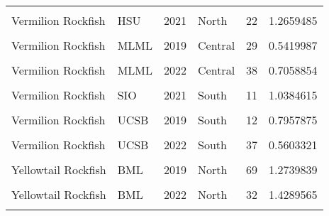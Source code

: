 \documentclass[
]{article}
\begin{document}
\begin{longtable}[t]{llrlrr}
\cellcolor{gray!6}{Vermilion Rockfish} & \cellcolor{gray!6}{HSU} & \cellcolor{gray!6}{2019} & \cellcolor{gray!6}{North} & \cellcolor{gray!6}{15} & \cellcolor{gray!6}{1.3187554}\\
Vermilion Rockfish & HSU & 2021 & North & 22 & 1.2659485\\
\cellcolor{gray!6}{Vermilion Rockfish} & \cellcolor{gray!6}{HSU} & \cellcolor{gray!6}{2022} & \cellcolor{gray!6}{North} & \cellcolor{gray!6}{13} & \cellcolor{gray!6}{1.0557610}\\
Vermilion Rockfish & MLML & 2019 & Central & 29 & 0.5419987\\
\addlinespace
\cellcolor{gray!6}{Vermilion Rockfish} & \cellcolor{gray!6}{MLML} & \cellcolor{gray!6}{2021} & \cellcolor{gray!6}{Central} & \cellcolor{gray!6}{18} & \cellcolor{gray!6}{0.6092897}\\
Vermilion Rockfish & MLML & 2022 & Central & 38 & 0.7058854\\
\cellcolor{gray!6}{Vermilion Rockfish} & \cellcolor{gray!6}{SIO} & \cellcolor{gray!6}{2019} & \cellcolor{gray!6}{South} & \cellcolor{gray!6}{11} & \cellcolor{gray!6}{0.4227564}\\
Vermilion Rockfish & SIO & 2021 & South & 11 & 1.0384615\\
\cellcolor{gray!6}{Vermilion Rockfish} & \cellcolor{gray!6}{SIO} & \cellcolor{gray!6}{2022} & \cellcolor{gray!6}{South} & \cellcolor{gray!6}{36} & \cellcolor{gray!6}{0.5225564}\\
\addlinespace
Vermilion Rockfish & UCSB & 2019 & South & 12 & 0.7957875\\
\cellcolor{gray!6}{Vermilion Rockfish} & \cellcolor{gray!6}{UCSB} & \cellcolor{gray!6}{2021} & \cellcolor{gray!6}{South} & \cellcolor{gray!6}{25} & \cellcolor{gray!6}{0.6141829}\\
Vermilion Rockfish & UCSB & 2022 & South & 37 & 0.5603321\\
\cellcolor{gray!6}{Widow Rockfish} & \cellcolor{gray!6}{BML} & \cellcolor{gray!6}{2019} & \cellcolor{gray!6}{North} & \cellcolor{gray!6}{3} & \cellcolor{gray!6}{0.3504274}\\
Yellowtail Rockfish & BML & 2019 & North & 69 & 1.2739839\\
\addlinespace
\cellcolor{gray!6}{Yellowtail Rockfish} & \cellcolor{gray!6}{BML} & \cellcolor{gray!6}{2021} & \cellcolor{gray!6}{North} & \cellcolor{gray!6}{105} & \cellcolor{gray!6}{1.9997415}\\
Yellowtail Rockfish & BML & 2022 & North & 32 & 1.4289565\\
\cellcolor{gray!6}{Yellowtail Rockfish} & \cellcolor{gray!6}{Cal Poly} & \cellcolor{gray!6}{2019} & \cellcolor{gray!6}{Central} & \cellcolor{gray!6}{21} & \cellcolor{gray!6}{0.8394260}\\

\end{longtable}
\end{document}
